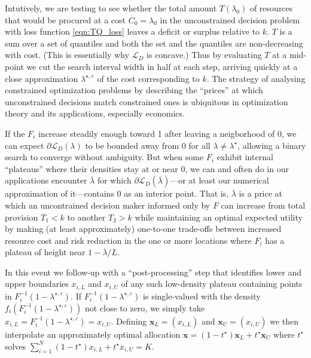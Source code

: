 \documentclass{article}
\begin{document}
Intutively, we are testing to see whether the total amount $T(\lambda_0)$ of resources that would be procured at a cost $C_0=\lambda_0$ in the unconstrained decision problem with loss function \eqref{eqn:TQ_loss} leaves a deficit or surplus relative to $k$. $T$ is a sum over a set of quantiles and both the set and the quantiles are non-decreasing with cost. (This is essentially why $\mathcal{L}_D$ is concave.) Thus by evaluating $T$ at a mid-point we cut the search interval width in half at each step, arriving quickly at a close approximation $\lambda^{\star, \varepsilon}$ of the cost corresponding to $k$. The strategy of analysing constrained optimization problems by describing the ``prices'' at which unconstrained decisions match constrained ones is ubiquitous in optimization theory and its applications, especially economics.

If the $F_i$ increase steadily enough toward 1 after leaving a neigborhood of 0, we can expect $\partial \mathcal{L}_D(\lambda)$ to be bounded away from 0 for all $\lambda \neq \lambda^{\star}$, allowing a binary search to converge without ambiguity.  But when some $F_i$ exhibit internal ``plateaus'' where their densities stay at or near 0, we can and often do in our applications encounter $\overline{\lambda}$ for which $\partial \mathcal{L}_D(\overline{\lambda})$---or at least our numerical approximation of it---contains 0 as an interior point. That is, $\overline{\lambda}$ is a price at which an uncontrained decision maker informed only by $F$ can increase from total provision $T_1<k$ to another $T_2>k$ while maintaining an optimal expected utility by making (at least approximately) one-to-one trade-offs between increased resource cost and risk reduction in the one or more locations where $F_i$ has a plateau of height near $1-\overline{\lambda}/L$. 

In this event we follow-up with a ``post-processing'' step that identifies lower and upper boundaries $x_{i,L}$ and $x_{i,U}$ of any
such low-density plateau containing points in $F_{i}^{-1}(1-\lambda^{\star, \varepsilon})$. If $F_{i}^{-1}(1-\lambda^{\star, \varepsilon})$ is single-valued 
with the density $f_i(F_{i}^{-1}(1-\lambda^{\star, \varepsilon}))$ not close to zero, we simply take $x_{i,L} = F_{i}^{-1}(1-\lambda^{\star, \varepsilon}) = x_{i,U}$. Defining $\mathbf{x}_L = (x_{i,L})$ and $\mathbf{x}_U = (x_{i,U})$ we then interpolate an approximately optimal allocation 
$\mathbf{x} = (1-t^{\star})\mathbf{x}_L + t^{\star}\mathbf{x}_U$ where $t^{\star}$ solves 
$\sum_{i=1}^{N }(1-t^{\star})x_{i,L} + t^{\star}x_{i,U} = K$.
\end{document}
